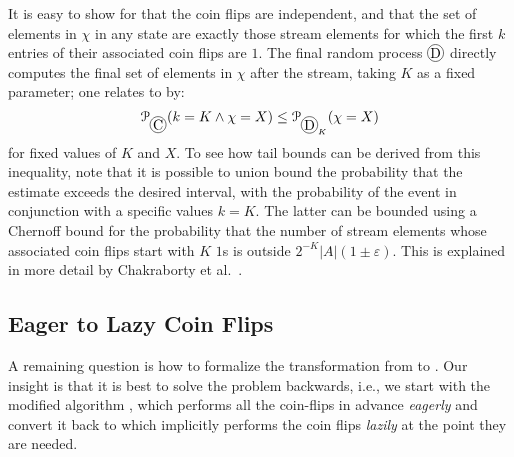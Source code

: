 It is easy to show for  that the coin flips are independent, and that the set of elements in $\chi$ in any state are exactly those stream elements for which the first $k$ entries of their associated coin flips are $1$.
The final random process $\circled{D}$ directly computes the final set of elements in $\chi$ after the stream, taking $K$ as a fixed parameter; one relates  to  by:
\[ \prob_{\circled{C}}(k = K \land \chi = X)  \leq \prob_{\circled{D}_K}(\chi = X)\]
for fixed values of $K$ and $X$.
To see how tail bounds can be derived from this inequality, note that it is possible to union bound the probability that the estimate exceeds the desired interval, with the probability of the event in conjunction with a specific values $k = K$.
The latter can be bounded using a Chernoff bound for the probability that the number of stream elements whose associated coin flips start with $K$ $1$s is outside $2^{-K} |A| (1 \pm \varepsilon)$.
This is explained in more detail by Chakraborty et al.~\cite{chakraborty2023}.

%
\subsection{Eager to Lazy Coin Flips}
A remaining question is how to formalize the transformation from  to .
Our insight is that it is best to solve the problem backwards, i.e., we start with the modified algorithm , which performs all the coin-flips in advance \emph{eagerly} and convert it back to  which implicitly performs the coin flips \emph{lazily} at the point they are needed.

